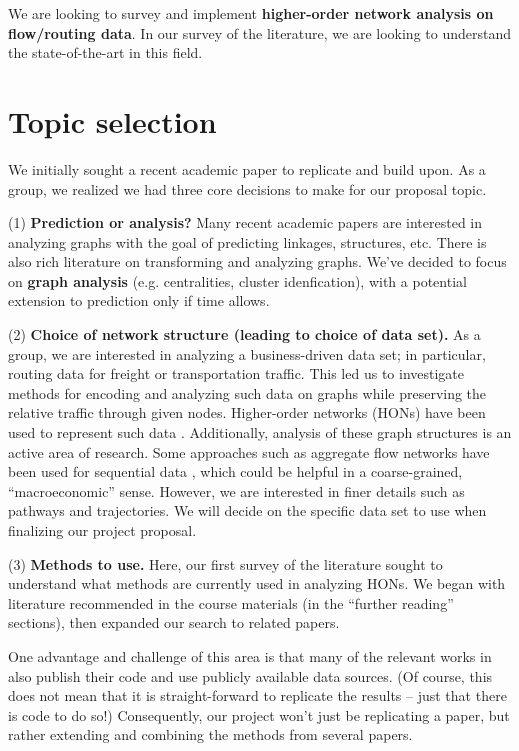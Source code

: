 \documentclass[sigconf]{acmart}
\begin{document}
We are looking to survey and implement \textbf{higher-order network analysis on flow/routing data}. In our survey of the literature, we are looking to understand the state-of-the-art in this field.

\section{Topic selection}

We initially sought a recent academic paper to replicate and build upon. As a group, we realized we had three core decisions to make for our proposal topic.

(1) \textbf{Prediction or analysis?} Many recent academic papers are interested in analyzing graphs with the goal of predicting linkages, structures, etc. There is also rich literature on transforming and analyzing graphs. We've decided to focus on \textbf{graph analysis} (e.g. centralities, cluster idenfication), with a potential extension to prediction only if time allows. 

(2) \textbf{Choice of network structure (leading to choice of data set).} As a group, we are interested in analyzing a business-driven data set; in particular, routing data for freight or transportation traffic. This led us to investigate methods for encoding and analyzing such data on graphs while preserving the relative traffic through given nodes. Higher-order networks (HONs) have been used to represent such data \cite{Xu2016, Rosvall2014, Edler2017, Benson2016, Benson2018}. Additionally, analysis of these graph structures is an active area of research. Some approaches such as aggregate flow networks have been used for sequential data \cite{Safavi2018}, which could be helpful in a coarse-grained, ``macroeconomic'' sense. However, we are interested in finer details such as pathways and trajectories. We will decide on the specific data set to use when finalizing our project proposal.

(3) \textbf{Methods to use.} Here, our first survey of the literature sought to understand what methods are currently used in analyzing HONs. We began with literature recommended in the course materials (in the ``further reading'' sections), then expanded our search to related papers. 

One advantage and challenge of this area is that many of the relevant works in also publish their code and use publicly available data sources. (Of course, this does not mean that it is straight-forward to replicate the results -- just that there is code to do so!) Consequently, our project won't just be replicating a paper, but rather extending and combining the methods from several papers.
\end{document}
